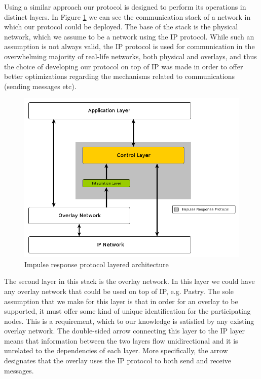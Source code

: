 \documentclass[a4paper,11pt,twoside]{report}
\begin{document}
Using a similar approach our protocol is designed to perform its operations in distinct layers. In Figure \ref{fig:design_overview} we can see the communication stack of a network in which our protocol could be deployed. The base of the stack is the physical network, which we assume to be a network using the IP protocol. While such an assumption is not always valid, the IP protocol is used for communication in the overwhelming majority of real-life networks, both physical and overlays, and thus the choice of developing our protocol on top of IP was made in order to offer better optimizations regarding the mechanisms related to communications (sending messages etc). \\  

\begin{figure}[h]
   \centering
     \includegraphics[scale=0.5]{../figures/protocol_stack.png}
	 \caption{Impulse response protocol layered architecture}
     \label{fig:design_overview}
\end{figure}

The second layer in this stack is the overlay network. In this layer we could have any overlay network that could be used on top of IP, e.g. Pastry. The sole assumption that we make for this layer is that in order for an overlay to be supported, it must offer some kind of unique identification for the participating nodes. This is a requirement, which to our knowledge is satisfied by any existing overlay network. The double-sided arrow connecting this layer to the IP layer means that information between the two layers flow unidirectional and it is unrelated to the dependencies of each layer. More specifically, the arrow designates that the overlay uses the IP protocol to both send and receive messages.\\
\end{document}
